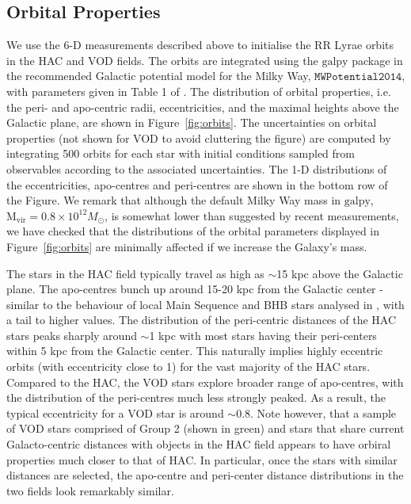 \documentclass[fleqn,usenatbib]{mnras}
\begin{document}
\subsection{Orbital Properties}

We use the 6-D measurements described above to initialise the RR Lyrae
orbits in the HAC and VOD fields. The orbits are integrated using the
$\mathrm{galpy}$ package \citep{Bovy2015} in the recommended Galactic
potential model for the Milky Way, $\texttt{MWPotential2014}$, with
parameters given in Table 1 of \citet{Bovy2015}. The distribution of 
orbital
properties, i.e. the peri- and apo-centric radii, eccentricities, and
the maximal heights above the Galactic plane, are shown in
Figure~\ref{fig:orbits}. The uncertainties on orbital properties
(not shown for VOD to avoid cluttering the figure) are computed by 
integrating 500 orbits for each star with 
initial conditions sampled from observables according to
the associated uncertainties. The 1-D distributions of the
eccentricities, apo-centres and peri-centres are shown in the bottom
row of the Figure.  We remark that although the default Milky Way mass in
$\mathrm{galpy}$, $\mathrm{M_{vir}} = 0.8 \times 10^{12} M_{\odot}$,
is somewhat lower than suggested by recent measurements, we have
checked that the distributions of the orbital parameters
displayed in Figure~\ref{fig:orbits} are minimally affected if we
increase the Galaxy's mass.

The stars in the HAC field typically travel as high as $\sim$15 kpc
above the Galactic plane. The apo-centres bunch up around 15-20 kpc
from the Galactic center - similar to the behaviour of local Main
Sequence and BHB stars analysed in \citet{Deason2018pileup}, with a
tail to higher values. The distribution of the peri-centric distances
of the HAC stars peaks sharply around $\sim$1 kpc with most stars
having their peri-centers within 5 kpc from the Galactic center. This
naturally implies highly eccentric orbits (with eccentricity close to
1) for the vast majority of the HAC stars. Compared to the HAC, the
VOD stars explore broader range of apo-centres, with the distribution
of the peri-centres much less strongly peaked. As a result, the
typical eccentricity for a VOD star is around $\sim$0.8. Note however,
that a sample of VOD stars comprised of Group 2 (shown in green) and
stars that share current Galacto-centric distances with objects
in the HAC field appears to have orbiral properties much closer to
that of HAC. In particular, once the stars with similar distances are
selected, the apo-centre and peri-center distance distributions in the
two fields look remarkably similar.
\end{document}
